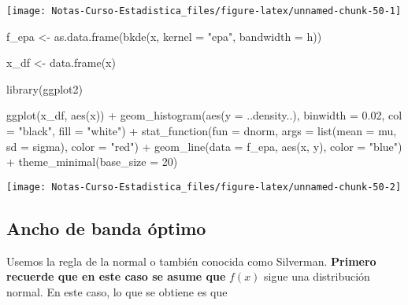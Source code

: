 \documentclass[
  12pt,
]{book}
\newenvironment{Shaded}{\begin{snugshade}}{\end{snugshade}}
\newcommand{\AttributeTok}[1]{\textcolor[rgb]{0.77,0.63,0.00}{#1}}
\newcommand{\DecValTok}[1]{\textcolor[rgb]{0.00,0.00,0.81}{#1}}
\newcommand{\FloatTok}[1]{\textcolor[rgb]{0.00,0.00,0.81}{#1}}
\newcommand{\FunctionTok}[1]{\textcolor[rgb]{0.00,0.00,0.00}{#1}}
\newcommand{\NormalTok}[1]{#1}
\newcommand{\OtherTok}[1]{\textcolor[rgb]{0.56,0.35,0.01}{#1}}
\newcommand{\SpecialCharTok}[1]{\textcolor[rgb]{0.00,0.00,0.00}{#1}}
\newcommand{\StringTok}[1]{\textcolor[rgb]{0.31,0.60,0.02}{#1}}
\theoremstyle{definition}
\theoremstyle{definition}
\theoremstyle{definition}
\theoremstyle{definition}
\theoremstyle{remark}
\begin{document}
\begin{center}\texttt{[image: Notas-Curso-Estadistica\_files/figure-latex/unnamed-chunk-50-1]} \end{center}

\begin{Shaded}
\begin{Highlighting}[]
\NormalTok{f\_epa }\OtherTok{\textless{}{-}} \FunctionTok{as.data.frame}\NormalTok{(}\FunctionTok{bkde}\NormalTok{(x, }\AttributeTok{kernel =} \StringTok{"epa"}\NormalTok{, }\AttributeTok{bandwidth =}\NormalTok{ h))}

\NormalTok{x\_df }\OtherTok{\textless{}{-}} \FunctionTok{data.frame}\NormalTok{(x)}

\FunctionTok{library}\NormalTok{(ggplot2)}

\FunctionTok{ggplot}\NormalTok{(x\_df, }\FunctionTok{aes}\NormalTok{(x)) }\SpecialCharTok{+} \FunctionTok{geom\_histogram}\NormalTok{(}\FunctionTok{aes}\NormalTok{(}\AttributeTok{y =}\NormalTok{ ..density..),}
    \AttributeTok{binwidth =} \FloatTok{0.02}\NormalTok{, }\AttributeTok{col =} \StringTok{"black"}\NormalTok{, }\AttributeTok{fill =} \StringTok{"white"}\NormalTok{) }\SpecialCharTok{+}
    \FunctionTok{stat\_function}\NormalTok{(}\AttributeTok{fun =}\NormalTok{ dnorm, }\AttributeTok{args =} \FunctionTok{list}\NormalTok{(}\AttributeTok{mean =}\NormalTok{ mu,}
        \AttributeTok{sd =}\NormalTok{ sigma), }\AttributeTok{color =} \StringTok{"red"}\NormalTok{) }\SpecialCharTok{+} \FunctionTok{geom\_line}\NormalTok{(}\AttributeTok{data =}\NormalTok{ f\_epa,}
    \FunctionTok{aes}\NormalTok{(x, y), }\AttributeTok{color =} \StringTok{"blue"}\NormalTok{) }\SpecialCharTok{+} \FunctionTok{theme\_minimal}\NormalTok{(}\AttributeTok{base\_size =} \DecValTok{20}\NormalTok{)}
\end{Highlighting}
\end{Shaded}

\begin{center}\texttt{[image: Notas-Curso-Estadistica\_files/figure-latex/unnamed-chunk-50-2]} \end{center}

\hypertarget{ancho-de-banda-uxf3ptimo-1}{%
\subsection{Ancho de banda óptimo}\label{ancho-de-banda-uxf3ptimo-1}}

Usemos la regla de la normal o también conocida como Silverman.
\textbf{Primero recuerde que en este caso se asume que} \(f(x)\) sigue una
distribución normal. En este caso, lo que se obtiene es que
\end{document}
